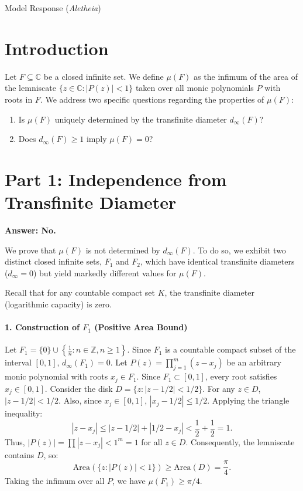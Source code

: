 \documentclass[11pt]{article}
\begin{document}
\begin{solution}{Model Response (\emph{Aletheia})}
    \section{Introduction}

Let $F \subseteq \mathbb{C}$ be a closed infinite set. We define $\mu(F)$ as the infimum of the area of the lemniscate $\{z \in \mathbb{C} : |P(z)| < 1\}$ taken over all monic polynomials $P$ with roots in $F$.
We address two specific questions regarding the properties of $\mu(F)$:
\begin{enumerate}
    \item Is $\mu(F)$ uniquely determined by the transfinite diameter $d_\infty(F)$?
    \item Does $d_\infty(F) \ge 1$ imply $\mu(F) = 0$?
\end{enumerate}



\section{Part 1: Independence from Transfinite Diameter}

\textbf{Answer: No.}

We prove that $\mu(F)$ is not determined by $d_\infty(F)$. To do so, we exhibit two distinct closed infinite sets, $F_1$ and $F_2$, which have identical transfinite diameters ($d_\infty = 0$) but yield markedly different values for $\mu(F)$.

Recall that for any countable compact set $K$, the transfinite diameter (logarithmic capacity) is zero.

\paragraph{1. Construction of $F_1$ (Positive Area Bound)}

Let $F_1 = \{0\} \cup \left\{ \frac{1}{n} : n \in \mathbb{Z}, n \ge 1 \right\}$.
Since $F_1$ is a countable compact subset of the interval $[0, 1]$, $d_\infty(F_1) = 0$.
Let $P(z) = \prod_{j=1}^m (z - x_j)$ be an arbitrary monic polynomial with roots $x_j \in F_1$.
Since $F_1 \subset [0, 1]$, every root satisfies $x_j \in [0, 1]$.
Consider the disk $D = \{ z : |z - 1/2| < 1/2 \}$.
For any $z \in D$, $|z - 1/2| < 1/2$. Also, since $x_j \in [0, 1]$, $|x_j - 1/2| \le 1/2$.
Applying the triangle inequality:
\[ |z - x_j| \le |z - 1/2| + |1/2 - x_j| < \frac{1}{2} + \frac{1}{2} = 1. \]
Thus, $|P(z)| = \prod |z - x_j| < 1^m = 1$ for all $z \in D$.
Consequently, the lemniscate contains $D$, so:
\[ \text{Area}(\{z : |P(z)| < 1\}) \ge \text{Area}(D) = \frac{\pi}{4}. \]
Taking the infimum over all $P$, we have $\mu(F_1) \ge \pi/4$.


\end{solution}
\end{document}
